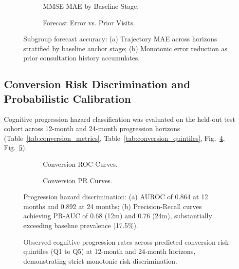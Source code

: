 \documentclass[11pt,a4paper]{article}
\begin{document}
\begin{figure}[t]
\centering
\begin{subfigure}[t]{0.48\linewidth}
    \centering
    \caption{MMSE MAE by Baseline Stage.}
    \label{fig:forecast_by_stage}
\end{subfigure}
\hfill
\begin{subfigure}[t]{0.48\linewidth}
    \centering
    \caption{Forecast Error vs. Prior Visits.}
    \label{fig:forecast_by_nvisits}
\end{subfigure}
\caption{Subgroup forecast accuracy: (a) Trajectory MAE across horizons stratified by baseline anchor stage; (b) Monotonic error reduction as prior consultation history accumulates.}
\label{fig:forecast_subgroups}
\end{figure}

\subsection{Conversion Risk Discrimination and Probabilistic Calibration}
\label{sec:results_conversion}
Cognitive progression hazard classification was evaluated on the held-out test cohort across 12-month and 24-month progression horizons (Table~\ref{tab:conversion_metrics}, Table~\ref{tab:conversion_quintiles}, Fig.~\ref{fig:conversion_roc}, Fig.~\ref{fig:conversion_pr}).




\begin{figure}[t]
\centering
\begin{subfigure}[t]{0.48\linewidth}
    \centering
    \caption{Conversion ROC Curves.}
    \label{fig:conversion_roc}
\end{subfigure}
\hfill
\begin{subfigure}[t]{0.48\linewidth}
    \centering
    \caption{Conversion PR Curves.}
    \label{fig:conversion_pr}
\end{subfigure}
\caption{Progression hazard discrimination: (a) AUROC of 0.864 at 12 months and 0.892 at 24 months; (b) Precision-Recall curves achieving PR-AUC of 0.68 (12m) and 0.76 (24m), substantially exceeding baseline prevalence (17.5\%).}
\label{fig:roc_pr_conversion}
\end{figure}

\begin{figure}[t]
\centering
{}
\caption{Observed cognitive progression rates across predicted conversion risk quintiles (Q1 to Q5) at 12-month and 24-month horizons, demonstrating strict monotonic risk discrimination.}
\label{fig:risk_quintiles}
\end{figure}
\end{document}
